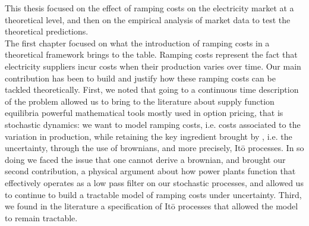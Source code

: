 \doublespacing

This thesis focused on the effect of ramping costs on the electricity market at a theoretical level, and then on the empirical analysis of market data to test the theoretical predictions.\\

The first chapter focused on what the introduction of ramping costs in a theoretical framework brings to the table. Ramping costs represent the fact that electricity suppliers incur costs when their production varies over time. Our main contribution has been to build and justify how these ramping costs can be tackled theoretically. First, we noted that going to a continuous time description of the problem allowed us to bring to the literature about supply function equilibria powerful mathematical tools mostly used in option pricing, that is stochastic dynamics: we want to model ramping costs, i.e. costs associated to the variation in production, while retaining the key ingredient brought by \cite{KM}, i.e. the uncertainty, through the use of brownians, and more precisely, It\={o} processes. In so doing we faced the issue that one cannot derive a brownian, and brought our second contribution, a physical argument about how power plants function that effectively operates as a low pass filter on our stochastic processes, and allowed us to continue to build a tractable model of ramping costs under uncertainty. Third, we found in the literature a specification of It\={o} processes that allowed the model to remain tractable. \\


